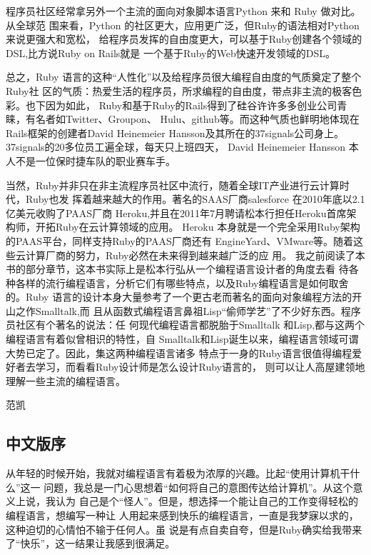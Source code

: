 \documentclass[color=cyan,mathpazo,titlestyle=hang]{elegantbook}
\begin{document}
程序员社区经常拿另外一个主流的面向对象脚本语言Python 来和 Ruby 做对比。从全球范
围来看，Python 的社区更大，应用更广泛，但Ruby的语法相对Python来说更强大和宽松，
给程序员发挥的自由度更大，可以基于Ruby创建各个领域的DSL,比方说Ruby on Rails就是
一个基于Ruby的Web快速开发领域的DSL。

总之，Ruby 语言的这种“人性化”以及给程序员很大编程自由度的气质奠定了整个Ruby社
区的气质：热爱生活的程序员，所求编程的自由度，带点非主流的极客色彩。也下因为如此，
Ruby和基于Ruby的Rails得到了硅谷许许多多创业公司青睐，有名者如Twitter、Groupon、
Hulu、github等。而这种气质也鲜明地体现在Rails框架的创建者David Heinemeier
Hansson及其所在的37signals公司身上。37signals的20多位员工遍全球，每天只上班四天，
David Heinemeier Hansson 本人不是一位保时捷车队的职业赛车手。

当然，Ruby并非只在非主流程序员社区中流行，随着全球IT产业进行云计算时代，Ruby也发
挥着越来越大的作用。著名的SAAS厂商salesforce 在2010年底以2.1亿美元收购了PAAS厂商
Heroku,并且在2011年7月聘请松本行担任Heroku首席架构师，开拓Ruby在云计算领域的应用。
Heroku 本身就是一个完全采用Ruby架构的PAAS平台，同样支持Ruby的PAAS厂商还有
EngineYard、VMware等。随着这些云计算厂商的努力，Ruby必然在未来得到越来越广泛的应
用。
我之前阅读了本书的部分章节，这本书实际上是松本行弘从一个编程语言设计者的角度去看
待各种各样的流行编程语言，分析它们有哪些特点，以及Ruby编程语言是如何取舍的。Ruby
语言的设计本身大量参考了一个更古老而著名的面向对象编程方法的开山之作Smalltalk,而
且从函数式编程语言鼻祖Lisp“偷师学艺”了不少好东西。程序员社区有个著名的说法：任
何现代编程语言都脱胎于Smalltalk 和Lisp,都与这两个编程语言有着似曾相识的特性，自
Smalltalk和Lisp诞生以来，编程语言领域可谓大势已定了。因此，集这两种编程语言诸多
特点于一身的Ruby语言很值得编程爱好者去学习，而看看Ruby设计师是怎么设计Ruby语言的，
则可以让人高屋建领地理解一些主流的编程语言。

范凯
\begin{LaTeX}
  \newpage
\end{LaTeX}

\subsection{中文版序}
\label{sec:org6584805}

从年轻的时候开始，我就对编程语言有着极为浓厚的兴趣。比起“使用计算机干什么”这一
问题，我总是一门心思想着“如何将自己的意图传达给计算机”。从这个意义上说，我认为
自己是个“怪人”。但是，想选择一个能让自己的工作变得轻松的编程语言，想编写一种让
人用起来感到快乐的编程语言，一直是我梦寐以求的，这种迫切的心情怕不输于任何人。虽
说是有点自卖自夸，但是Ruby确实给我带来了“快乐”，这一结果让我感到很满足。
\end{document}
